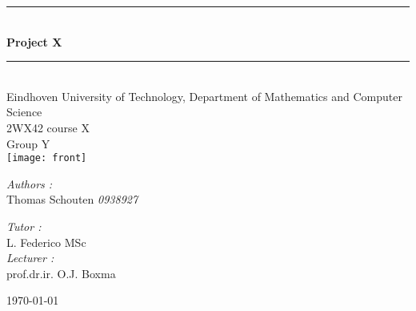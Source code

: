 \documentclass{article}
\begin{document}

    \begin{titlepage}
        \begin{center}

            \rule{\linewidth}{0.5mm} \\[0.4cm]
        { \huge \bfseries Project X \\[0.4cm] }
            \rule{\linewidth}{0.5mm} \\[1.5cm]
            
             {\large  Eindhoven University of Technology, Department of Mathematics and Computer Science}\\[0.5cm]

        {\large 2WX42 course X}\\[0.5cm]
        {\large Group Y} \\[0.5cm]
            
             \texttt{[image: front]}\\[1cm]

            \noindent
            \begin{minipage}{0.4\textwidth}
                \begin{flushleft} \large
                    \emph{Authors :}\\
                    Thomas Schouten \textit{0938927}
                \end{flushleft}
            \end{minipage}%
            \begin{minipage}{0.4\textwidth}
                \begin{flushright} \large
                    \emph{Tutor :} \\
                    L. Federico MSc \\
                    \emph{Lecturer :} \\
                    prof.dr.ir. O.J. Boxma
                \end{flushright}
            \end{minipage}

            \vfill

            {\large \today}

        \end{center}
    \end{titlepage}

\newpage
\tableofcontents
\newpage

    \listoffixmes

    

\cleardoublepage


\end{document}

